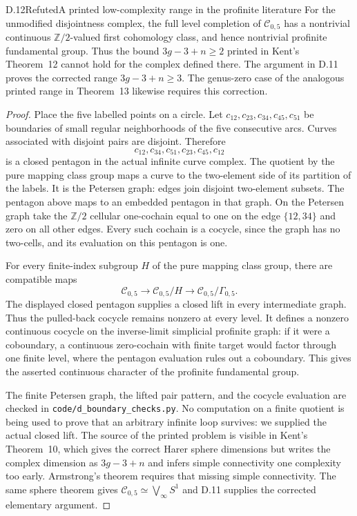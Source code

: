 \begin{result}{D.12}{Refuted}{A printed low-complexity range in the profinite literature}
For the unmodified disjointness complex, the full level completion of $\mathcal C_{0,5}$ has a nontrivial continuous $\mathbb Z/2$-valued first cohomology class, and hence nontrivial profinite fundamental group. Thus the bound $3g-3+n\geq2$ printed in Kent's Theorem~12 cannot hold for the complex defined there. The argument in D.11 proves the corrected range $3g-3+n\geq3$. The genus-zero case of the analogous printed range in Theorem~13 likewise requires this correction.
\end{result}
\begin{proof}
Place the five labelled points on a circle. Let $c_{12},c_{23},c_{34},c_{45},c_{51}$ be boundaries of small regular neighborhoods of the five consecutive arcs. Curves associated with disjoint pairs are disjoint. Therefore
\[
 c_{12},c_{34},c_{51},c_{23},c_{45},c_{12}
\]
is a closed pentagon in the actual infinite curve complex. The quotient by the pure mapping class group maps a curve to the two-element side of its partition of the labels. It is the Petersen graph: edges join disjoint two-element subsets. The pentagon above maps to an embedded pentagon in that graph. On the Petersen graph take the $\mathbb Z/2$ cellular one-cochain equal to one on the edge $\{12,34\}$ and zero on all other edges. Every such cochain is a cocycle, since the graph has no two-cells, and its evaluation on this pentagon is one.

For every finite-index subgroup $H$ of the pure mapping class group, there are compatible maps
\[
 \mathcal C_{0,5}\longrightarrow\mathcal C_{0,5}/H
 \longrightarrow\mathcal C_{0,5}/\Gamma_{0,5}.
\]
The displayed closed pentagon supplies a closed lift in every intermediate graph. Thus the pulled-back cocycle remains nonzero at every level. It defines a nonzero continuous cocycle on the inverse-limit simplicial profinite graph: if it were a coboundary, a continuous zero-cochain with finite target would factor through one finite level, where the pentagon evaluation rules out a coboundary. This gives the asserted continuous character of the profinite fundamental group.

The finite Petersen graph, the lifted pair pattern, and the cocycle evaluation are checked in \texttt{code/d\_boundary\_checks.py}. No computation on a finite quotient is being used to prove that an arbitrary infinite loop survives: we supplied the actual closed lift. The source of the printed problem is visible in Kent's Theorem~10, which gives the correct Harer sphere dimensions but writes the complex dimension as $3g-3+n$ and infers simple connectivity one complexity too early. Armstrong's theorem requires that missing simple connectivity. The same sphere theorem gives $\mathcal C_{0,5}\simeq\bigvee_\infty S^1$ and D.11 supplies the corrected elementary argument.
\end{proof}

